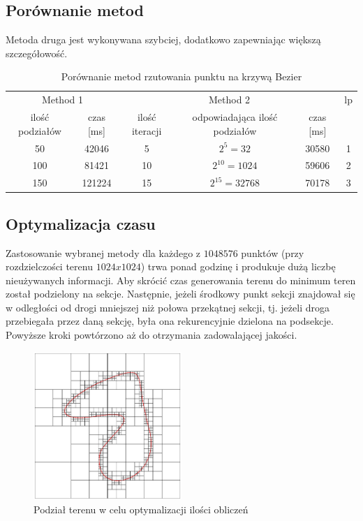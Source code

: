 \subsection{Porównanie metod}
Metoda druga jest wykonywana szybciej, dodatkowo zapewniając większą szczegółowość.
\begin{table}[h]
    \centering
    \begin{tabular}{|c|c|c|c|c|c|}
        \hline
        \multicolumn{2}{|c|}{Method 1} & \multicolumn{3}{c|}{Method 2} & lp\\
        ilość podziałów & czas [ms] & ilość iteracji & odpowiadająca ilość podziałów & czas [ms] & \\
        \hline
        \hline
        50 & 42046 & 5 & $2^{5}=32$ & 30580 & 1 \\
        100 & 81421 & 10 & $2^{10}=1024$ & 59606 & 2 \\
        150 & 121224 & 15 & $2^{15}=32768$ & 70178 & 3 \\
        \hline
    \end{tabular}
    \caption{Porównanie metod rzutowania punktu na krzywą Bezier}
    \label{table}
\end{table}
\clearpage

\subsection{Optymalizacja czasu}
Zastosowanie wybranej metody dla każdego z $1048576$ punktów (przy rozdzielczości terenu $1024 x 1024$) trwa ponad godzinę i produkuje dużą liczbę nieużywanych informacji. Aby skrócić czas generowania terenu do minimum teren został podzielony na sekcje. Następnie, jeżeli środkowy punkt sekcji znajdował się w odległości od drogi mniejszej niż połowa przekątnej sekcji, tj. jeżeli droga przebiegała przez daną sekcję, była ona rekurencyjnie dzielona na podsekcje. Powyższe kroki powtórzono aż do otrzymania zadowalającej jakości.
\begin{figure}[h]
    \centering
    \includegraphics[width=0.5\textwidth]{figures/terrain_subdivision_for_road}
    \caption{Podział terenu w celu optymalizacji ilości obliczeń}
    \label{fig}
\end{figure}

